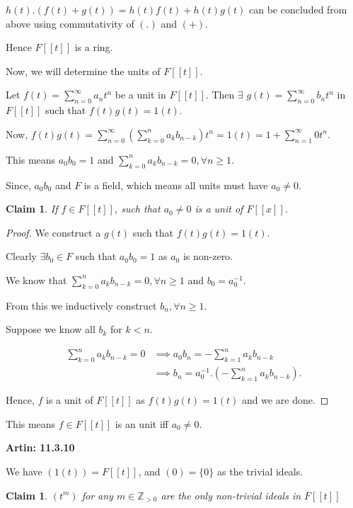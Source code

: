 \documentclass[12pt,a4paper]{article}
\newtheorem{claim}[theorem]{Claim}
\theoremstyle{definition}
\begin{document}
\begin{flushleft}
$h(t).(f(t) + g(t)) = h(t)f(t) + h(t)g(t) $ can be concluded from above using commutativity of $(.)$ and $(+)$.

\medskip

Hence $F[[t]]$ is a ring.

\medskip

Now, we will determine the units of $F[[t]]$.

Let $f(t) = \sum_{n=0}^{\infty} a_n t^n$ be a unit in $F[[t]]$. Then $\exists$ $g(t) = \sum_{n=0}^{\infty} b_n t^n$ in $F[[t]]$ such that $f(t)g(t) = 1(t)$.

Now, $f(t)g(t) = \sum_{n=0}^{\infty} (\sum_{k=0}^{n}a_kb_{n-k}) t^n = 1(t) = 1 + \sum_{n=1}^{\infty} 0t^n$.

This means $a_0b_0 = 1$ and $\sum_{k=0}^{n}a_kb_{n-k} = 0, \forall n \ge 1$.

Since, $a_0b_0$ and $F$ is a field, which means all units must have $a_0 \ne 0$.

\begin{claim}
	If $f \in F[[t]]$, such that $a_0 \ne 0$ is a unit of $F[[x]]$. 
\end{claim}

\begin{proof}
	We construct a $g(t)$ such that $f(t)g(t) = 1(t)$.

	Clearly $\exists b_0 \in F$ such that $a_0b_0 = 1$ as $a_0$ is non-zero.

	We know that $\sum_{k=0}^{n}a_kb_{n-k} = 0, \forall n \ge 1$ and $b_0 = a_0^{-1}$.

	From this we inductively construct $b_n, \forall n \ge 1$.

	Suppose we know all $b_k$ for $k < n$.

	\begin{align*}
		\sum_{k=0}^{n}a_kb_{n-k} = 0 &\implies a_0b_n = -\sum_{k=1}^{n} a_kb_{n-k} \\
		&\implies b_n = a_0^{-1}.(-\sum_{k=1}^{n} a_kb_{n-k}).
	\end{align*}

	Hence, $f$ is a unit of $F[[t]]$ as $f(t)g(t) = 1(t)$ and we are done.
\end{proof}

This means $f \in F[[t]]$ is an unit iff $a_0 \ne 0$.

\bigskip

{\bf Artin: 11.3.10}

We have $(1(t)) = F[[t]]$, and $(0) = \{0\}$ as the trivial ideals. 

\begin{claim}
	$(t^m)$ for any $m \in \mathbb{Z}_{>0}$ are the only non-trivial ideals in $F[[t]]$
\end{claim}


\end{flushleft}
\end{document}
